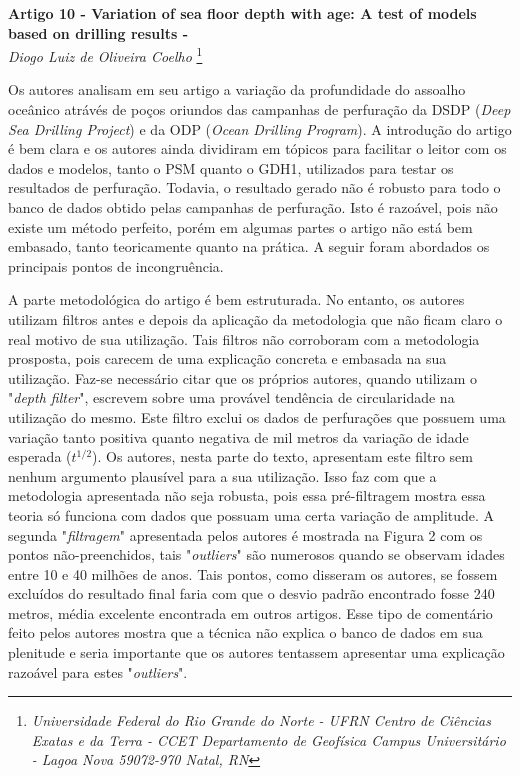 \documentclass[manuscript]{geophysics}[10pt]
\begin{document}
\begin{center}
\textbf{\LARGE
 Artigo 10 - Variation of sea floor depth with age: {A} test of models based on drilling results - \cite{johnson_variation_1992}} \\
\textit{Diogo Luiz de Oliveira Coelho}
\footnote{\textit{Universidade Federal do Rio Grande do Norte - UFRN
Centro de Ciências Exatas e da Terra - CCET
Departamento de Geofísica
Campus Universitário - Lagoa Nova
59072-970 Natal, RN}}
\end{center} 

Os autores analisam em seu artigo a variação da profundidade do assoalho oceânico atrávés de poços oriundos das campanhas de perfuração da DSDP (\textit{Deep Sea Drilling Project}) e da ODP (\textit{Ocean Drilling Program}). A introdução do artigo é bem clara e os autores ainda dividiram em tópicos para facilitar o leitor com os dados e modelos, tanto o PSM quanto o GDH1, utilizados para testar os resultados de perfuração. Todavia, o resultado gerado não é robusto para todo o banco de dados obtido pelas campanhas de perfuração. Isto é razoável, pois não existe um método perfeito, porém em algumas partes o artigo não está bem embasado, tanto teoricamente quanto na prática. A seguir foram abordados os principais pontos de incongruência.

A parte metodológica do artigo é bem estruturada. No entanto, os autores utilizam filtros antes e depois da aplicação da metodologia que não ficam claro o real motivo de sua utilização. Tais filtros não corroboram com a metodologia prosposta, pois carecem de uma explicação concreta e embasada na sua utilização. Faz-se necessário citar que os próprios autores, quando utilizam o "\textit{depth filter}", escrevem sobre uma provável tendência de circularidade na utilização do mesmo. Este filtro exclui os dados de perfurações que possuem uma variação tanto positiva quanto negativa de mil metros da variação de idade esperada ($t^{1/2}$). Os autores, nesta parte do texto, apresentam este filtro sem nenhum argumento plausível para a sua utilização. Isso faz com que a metodologia apresentada não seja robusta, pois essa pré-filtragem mostra essa teoria só funciona com dados que possuam uma certa variação de amplitude. A segunda "\textit{filtragem}" apresentada pelos autores é mostrada na Figura 2 com os pontos não-preenchidos, tais "\textit{outliers}" são numerosos quando se observam idades entre 10 e 40 milhões de anos. Tais pontos, como disseram os autores, se fossem excluídos do resultado final faria com que o desvio padrão encontrado fosse 240 metros, média excelente encontrada em outros artigos. Esse tipo de comentário feito pelos autores mostra que a técnica não explica o banco de dados em sua plenitude e seria importante que os autores tentassem apresentar uma explicação razoável para estes "\textit{outliers}".
\end{document}
